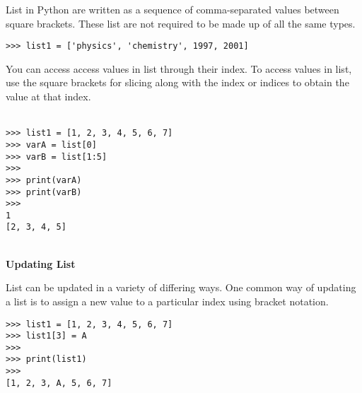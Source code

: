 \documentclass[letterpaper,11pt]{article}
\begin{document}
\par{List in Python are written as a sequence of comma-separated values between
square brackets. These list are not required to be made up of all the same
types.}
\\
\begin{minipage}{.5\textwidth}
    \begin{tcolorbox}
        \begin{footnotesize}
            \begin{verbatim}
>>> list1 = ['physics', 'chemistry', 1997, 2001]
            \end{verbatim}
        \end{footnotesize}
    \end{tcolorbox}
\end{minipage}
\par{You can access access values in list through their index. To access values
in list, use the square brackets for slicing along with the index or indices to
obtain the value at that index.}
\\ \\
\begin{minipage}{.5\textwidth}
    \begin{tcolorbox}
        \begin{footnotesize}
            \begin{verbatim}
>>> list1 = [1, 2, 3, 4, 5, 6, 7]
>>> varA = list[0]
>>> varB = list[1:5]
>>>
>>> print(varA)
>>> print(varB)
>>>
1
[2, 3, 4, 5]
            \end{verbatim}
        \end{footnotesize}
    \end{tcolorbox}
\end{minipage}
\\
\textbf{Updating List}
\par{List can be updated in a variety of differing ways. One common way of
updating a list is to assign a new value to a particular index using bracket
notation.}
\\
\begin{minipage}{.5\textwidth}
    \begin{tcolorbox}
        \begin{footnotesize}
            \begin{verbatim}
>>> list1 = [1, 2, 3, 4, 5, 6, 7]
>>> list1[3] = A
>>>
>>> print(list1)
>>>
[1, 2, 3, A, 5, 6, 7]
            \end{verbatim}
        \end{footnotesize}
    \end{tcolorbox}
\end{minipage}
\end{document}
